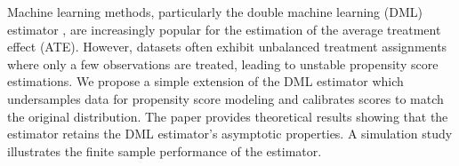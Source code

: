 Machine learning methods, particularly the double machine learning (DML) estimator \citep{Chernozhukov2018}, are increasingly popular for the estimation of the average treatment effect (ATE). However, datasets often exhibit unbalanced treatment assignments where only a few observations are treated, leading to unstable propensity score estimations. We propose a simple extension of the DML estimator which undersamples data for propensity score modeling and calibrates scores to match the original distribution. The paper provides theoretical results showing that the estimator retains the DML estimator's asymptotic properties. A simulation study illustrates the finite sample performance of the estimator.